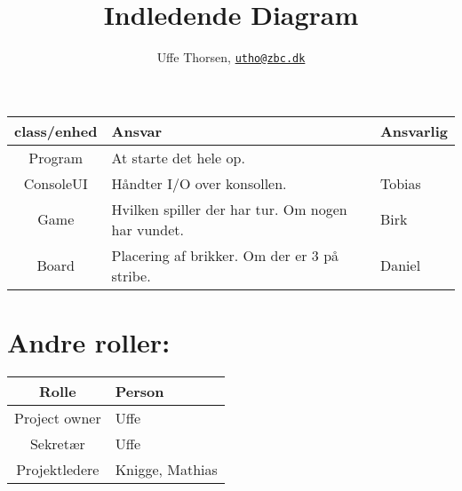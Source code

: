 \documentclass[a4, 12pt, landscape]{article}
\title{Indledende Diagram}
\author{Uffe Thorsen, \href{mailto:utho@zbc.dk}{\texttt{utho@zbc.dk}}}
\begin{document}
\thispagestyle{empty}
\hspace{-3cm}




\newpage

\hspace{-3cm}
\begin{tabular}{c|l|l}
\textbf{class/enhed} & \textbf{Ansvar} & \textbf{Ansvarlig}\\
\hline
Program & At starte det hele op. & \\
ConsoleUI & Håndter I/O over konsollen. & Tobias\\
Game & Hvilken spiller der har tur. Om nogen har vundet. & Birk\\
Board & Placering af brikker. Om der er 3 på stribe. & Daniel\\
\end{tabular}

\vfill{}

\section*{Andre roller:}

\begin{tabular}{c|l}
\textbf{Rolle} & \textbf{Person}\\
\hline
Project owner & Uffe\\
Sekretær & Uffe\\
Projektledere & Knigge, Mathias \\
\end{tabular}


\vfill{}
\end{document}
